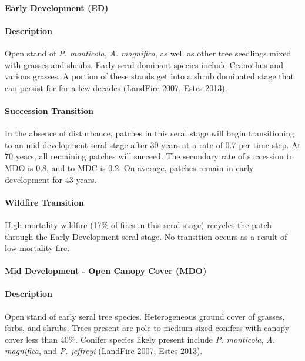 \paragraph{Early Development (ED)}

\paragraph{Description} Open stand of \emph{P. monticola}, \emph{A. magnifica}, as well as other tree seedlings mixed with grasses and shrubs. Early seral dominant species include Ceanothus and various grasses. A portion of these stands get into a shrub dominated stage that can persist for for a few decades (LandFire 2007, Estes 2013).

\paragraph{Succession Transition} In the absence of disturbance, patches in this seral stage will begin transitioning to an mid development seral stage after 30 years at a rate of 0.7 per time step. At 70 years, all remaining patches will succeed. The secondary rate of succession to MDO is 0.8, and to MDC is 0.2. On average, patches remain in early development for 43 years.

\paragraph{Wildfire Transition} High mortality wildfire (17\% of fires in this seral stage) recycles the patch through the Early Development seral stage. No transition occurs as a result of low mortality fire.

\noindent\hrulefill


\paragraph{Mid Development - Open Canopy Cover (MDO)}

\paragraph{Description} Open stand of early seral tree species. Heterogeneous ground cover of grasses, forbs, and shrubs. Trees present are pole to medium sized conifers with canopy cover less than 40\%. Conifer species likely present include \emph{P. monticola}, \emph{A. magnifica}, and \emph{P. jeffreyi} (LandFire 2007, Estes 2013).

